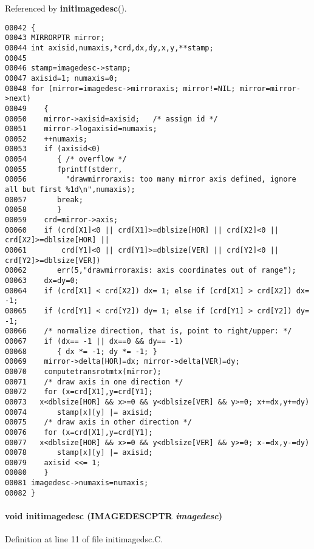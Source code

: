 Referenced by {\bf initimagedesc}().\small\begin{verbatim}00042 {
00043 MIRRORPTR mirror;
00044 int axisid,numaxis,*crd,dx,dy,x,y,**stamp;
00045 
00046 stamp=imagedesc->stamp;
00047 axisid=1; numaxis=0;
00048 for (mirror=imagedesc->mirroraxis; mirror!=NIL; mirror=mirror->next)
00049    {
00050    mirror->axisid=axisid;   /* assign id */
00051    mirror->logaxisid=numaxis;
00052    ++numaxis;
00053    if (axisid<0)
00054       { /* overflow */
00055       fprintf(stderr,
00056         "drawmirroraxis: too many mirror axis defined, ignore all but first %1d\n",numaxis);
00057       break;
00058       }
00059    crd=mirror->axis;
00060    if (crd[X1]<0 || crd[X1]>=dblsize[HOR] || crd[X2]<0 || crd[X2]>=dblsize[HOR] ||
00061        crd[Y1]<0 || crd[Y1]>=dblsize[VER] || crd[Y2]<0 || crd[Y2]>=dblsize[VER])
00062       err(5,"drawmirroraxis: axis coordinates out of range");
00063    dx=dy=0;
00064    if (crd[X1] < crd[X2]) dx= 1; else if (crd[X1] > crd[X2]) dx= -1;
00065    if (crd[Y1] < crd[Y2]) dy= 1; else if (crd[Y1] > crd[Y2]) dy= -1;
00066    /* normalize direction, that is, point to right/upper: */
00067    if (dx== -1 || dx==0 && dy== -1)
00068       { dx *= -1; dy *= -1; }
00069    mirror->delta[HOR]=dx; mirror->delta[VER]=dy;
00070    computetransrotmtx(mirror);
00071    /* draw axis in one direction */
00072    for (x=crd[X1],y=crd[Y1];
00073   x<dblsize[HOR] && x>=0 && y<dblsize[VER] && y>=0; x+=dx,y+=dy)
00074       stamp[x][y] |= axisid;
00075    /* draw axis in other direction */
00076    for (x=crd[X1],y=crd[Y1];
00077   x<dblsize[HOR] && x>=0 && y<dblsize[VER] && y>=0; x-=dx,y-=dy)
00078       stamp[x][y] |= axisid;
00079    axisid <<= 1;
00080    }
00081 imagedesc->numaxis=numaxis;
00082 }
\end{verbatim}\normalsize 
\label{initimagedsc.C_a0}
\paragraph{\setlength{\rightskip}{0pt plus 5cm}void initimagedesc ({\bf IMAGEDESCPTR} {\em imagedesc})}\hfill



Definition at line 11 of file initimagedsc.C.

